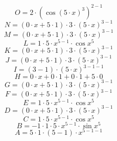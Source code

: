 \documentclass[12pt]{article}
\begin{document}
\begin{equation}
	O = 
2\cdot \left( \cos {\left( 5\cdot x\right) ^{3}}\right) ^{2 - 1}
\end{equation}
\begin{equation}
	N = 
\left( 0\cdot x + 5\cdot 1\right) \cdot 3\cdot \left( 5\cdot x\right) ^{3 - 1}
\end{equation}
\begin{equation}
	M = 
\left( 0\cdot x + 5\cdot 1\right) \cdot 3\cdot \left( 5\cdot x\right) ^{3 - 1}
\end{equation}
\begin{equation}
	L = 
1\cdot 5\cdot x^{5 - 1}\cdot \cos {x^{5}}
\end{equation}
\begin{equation}
	K = 
\left( 0\cdot x + 5\cdot 1\right) \cdot 3\cdot \left( 5\cdot x\right) ^{3 - 1}
\end{equation}
\begin{equation}
	J = 
\left( 0\cdot x + 5\cdot 1\right) \cdot 3\cdot \left( 5\cdot x\right) ^{3 - 1}
\end{equation}
\begin{equation}
	I = 
\left( 3 - 1\right) \cdot \left( 5\cdot x\right) ^{3 - 1 - 1}
\end{equation}
\begin{equation}
	H = 
0\cdot x + 0\cdot 1 + 0\cdot 1 + 5\cdot 0
\end{equation}
\begin{equation}
	G = 
\left( 0\cdot x + 5\cdot 1\right) \cdot 3\cdot \left( 5\cdot x\right) ^{3 - 1}
\end{equation}
\begin{equation}
	F = 
\left( 0\cdot x + 5\cdot 1\right) \cdot 3\cdot \left( 5\cdot x\right) ^{3 - 1}
\end{equation}
\begin{equation}
	E = 
1\cdot 5\cdot x^{5 - 1}\cdot \cos {x^{5}}
\end{equation}
\begin{equation}
	D = 
\left( 0\cdot x + 5\cdot 1\right) \cdot 3\cdot \left( 5\cdot x\right) ^{3 - 1}
\end{equation}
\begin{equation}
	C = 
1\cdot 5\cdot x^{5 - 1}\cdot \cos {x^{5}}
\end{equation}
\begin{equation}
	B = 
-1\cdot 1\cdot 5\cdot x^{5 - 1}\cdot \sin {x^{5}}
\end{equation}
\begin{equation}
	A = 
5\cdot 1\cdot \left( 5 - 1\right) \cdot x^{5 - 1 - 1}
\end{equation}
\end{document}
